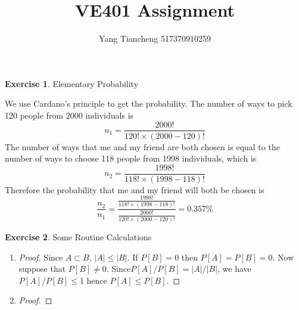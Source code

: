\documentclass[12pt,a4paper]{article}
\makeatletter
\theoremstyle{definition}
\newtheorem{exercise}{Exercise}
\newtheorem*{solution}{Solution}
\renewenvironment{solution}[1][Solution] {\par\pushQED{\qed}\normalfont\topsep6\p@\@plus6\p@\relax\trivlist\item[\hskip\labelsep\bfseries#1\@addpunct{.}]\ignorespaces}{\popQED\endtrivlist\@endpefalse} \makeatother
\makeatother
\begin{document}
\title{VE401 Assignment}
\author{Yang Tiancheng 517370910259}
\maketitle

\newpage

\begin{exercise}
Elementary Probability
\begin{solution}
We use Cardano's principle to get the probability. The number of ways to pick 120 people from 2000 individuals is
$$n_1=\frac{2000!}{120!\times(2000-120)!}$$
The number of ways that me and my friend are both chosen is equal to the number of ways to choose 118 people from 1998 individuals, which is
$$n_2=\frac{1998!}{118!\times(1998-118)!}$$
Therefore the probability that me and my friend will both be chosen is
$$\frac{n_2}{n_1}=\frac{\frac{1998!}{118!\times(1998-118)!}}{\frac{2000!}{120!\times(2000-120)!}}=0.357\%$$
\end{solution}
\end{exercise}

\begin{exercise}
Some Routine Calculations
\begin{enumerate}[label=\roman*)]
\item
\begin{proof}
Since $A\subset B$, $|A|\leq |B|$. If $P[B]=0$ then $P[A]=P[B]=0$. Now suppose that $P[B]\neq 0$. Since$P[A]/P[B]=|A|/|B|$, we have $P[A]/P[B]\leq 1$ hence $P[A]\leq P[B]$.
\end{proof}
\item
\begin{proof}

\end{proof}
\end{enumerate}
\end{exercise}

 
\end{document}
